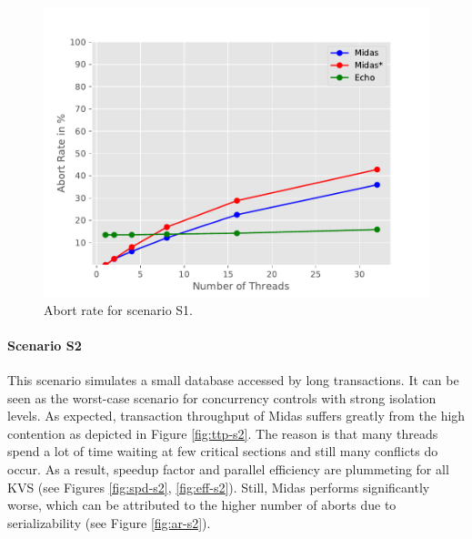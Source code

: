 \begin{figure}[h!]
\begin{minipage}[l]{0.50\textwidth}
    \label{fig:eff-s1}
\end{minipage}
\begin{minipage}[l]{0.50\textwidth}
    \includegraphics[width=\textwidth]{figures/bench/ar-ss}
    \caption{Abort rate for scenario S1.}
    \label{fig:ar-s1}
\end{minipage}
\end{figure}


\paragraph{Scenario S2}

This scenario simulates a small database accessed by long transactions. It can be seen as the worst-case scenario for concurrency controls with strong isolation levels. As expected, transaction throughput of Midas suffers greatly from the high contention as depicted in Figure \ref{fig:ttp-s2}. The reason is that many threads spend a lot of time waiting at few critical sections and still many conflicts do occur. As a result, speedup factor and parallel efficiency are plummeting for all KVS (see Figures \ref{fig:spd-s2}, \ref{fig:eff-s2}). Still, Midas performs significantly worse, which can be attributed to the higher number of aborts due to serializability (see Figure \ref{fig:ar-s2}).

